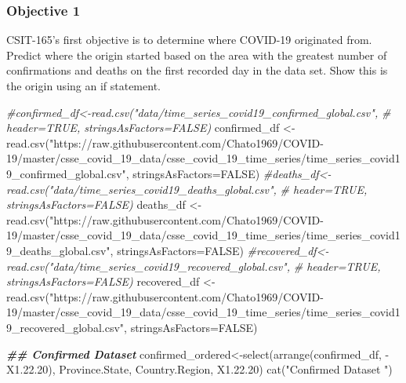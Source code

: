 \documentclass[
]{article}
\newenvironment{Shaded}{\begin{snugshade}}{\end{snugshade}}
\newcommand{\AttributeTok}[1]{\textcolor[rgb]{0.77,0.63,0.00}{#1}}
\newcommand{\CommentTok}[1]{\textcolor[rgb]{0.56,0.35,0.01}{\textit{#1}}}
\newcommand{\ConstantTok}[1]{\textcolor[rgb]{0.00,0.00,0.00}{#1}}
\newcommand{\DocumentationTok}[1]{\textcolor[rgb]{0.56,0.35,0.01}{\textbf{\textit{#1}}}}
\newcommand{\FloatTok}[1]{\textcolor[rgb]{0.00,0.00,0.81}{#1}}
\newcommand{\FunctionTok}[1]{\textcolor[rgb]{0.00,0.00,0.00}{#1}}
\newcommand{\NormalTok}[1]{#1}
\newcommand{\OtherTok}[1]{\textcolor[rgb]{0.56,0.35,0.01}{#1}}
\newcommand{\SpecialCharTok}[1]{\textcolor[rgb]{0.00,0.00,0.00}{#1}}
\newcommand{\StringTok}[1]{\textcolor[rgb]{0.31,0.60,0.02}{#1}}
\begin{document}
\hypertarget{objective-1}{%
\subsubsection{Objective 1}\label{objective-1}}

CSIT-165's first objective is to determine where COVID-19 originated
from. Predict where the origin started based on the area with the
greatest number of confirmations and deaths on the first recorded day in
the data set. Show this is the origin using an if statement.

\begin{Shaded}
\begin{Highlighting}[]
\CommentTok{\#confirmed\_df\textless{}{-}read.csv("data/time\_series\_covid19\_confirmed\_global.csv", }
\CommentTok{\#                       header=TRUE, stringsAsFactors=FALSE)}
\NormalTok{confirmed\_df }\OtherTok{\textless{}{-}} \FunctionTok{read.csv}\NormalTok{(}\StringTok{"https://raw.githubusercontent.com/Chato1969/COVID{-}19/master/csse\_covid\_19\_data/csse\_covid\_19\_time\_series/time\_series\_covid19\_confirmed\_global.csv"}\NormalTok{, }\AttributeTok{stringsAsFactors=}\ConstantTok{FALSE}\NormalTok{)}
\CommentTok{\#deaths\_df\textless{}{-}read.csv("data/time\_series\_covid19\_deaths\_global.csv", }
\CommentTok{\#                    header=TRUE, stringsAsFactors=FALSE)}
\NormalTok{deaths\_df }\OtherTok{\textless{}{-}} \FunctionTok{read.csv}\NormalTok{(}\StringTok{"https://raw.githubusercontent.com/Chato1969/COVID{-}19/master/csse\_covid\_19\_data/csse\_covid\_19\_time\_series/time\_series\_covid19\_deaths\_global.csv"}\NormalTok{, }\AttributeTok{stringsAsFactors=}\ConstantTok{FALSE}\NormalTok{)}
\CommentTok{\#recovered\_df\textless{}{-}read.csv("data/time\_series\_covid19\_recovered\_global.csv", }
\CommentTok{\#                       header=TRUE, stringsAsFactors=FALSE)}
\NormalTok{recovered\_df }\OtherTok{\textless{}{-}} \FunctionTok{read.csv}\NormalTok{(}\StringTok{"https://raw.githubusercontent.com/Chato1969/COVID{-}19/master/csse\_covid\_19\_data/csse\_covid\_19\_time\_series/time\_series\_covid19\_recovered\_global.csv"}\NormalTok{, }\AttributeTok{stringsAsFactors=}\ConstantTok{FALSE}\NormalTok{)}

\DocumentationTok{\#\# Confirmed Dataset}
\NormalTok{confirmed\_ordered}\OtherTok{\textless{}{-}}\FunctionTok{select}\NormalTok{(}\FunctionTok{arrange}\NormalTok{(confirmed\_df, }\SpecialCharTok{{-}}\NormalTok{X1.}\FloatTok{22.20}\NormalTok{), }
\NormalTok{                          Province.State, Country.Region, X1.}\FloatTok{22.20}\NormalTok{)}
\FunctionTok{cat}\NormalTok{(}\StringTok{"Confirmed Dataset "}\NormalTok{)}
\end{Highlighting}
\end{Shaded}
\end{document}
